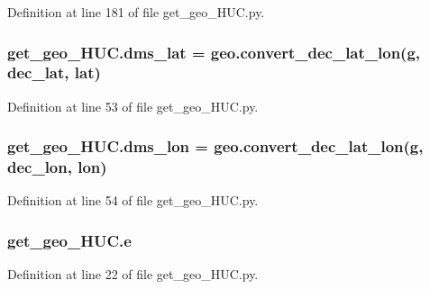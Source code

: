 Definition at line 181 of file get\+\_\+geo\+\_\+\+H\+U\+C.\+py.

\subsubsection[{\texorpdfstring{dms\+\_\+lat}{dms_lat}}]{\setlength{\rightskip}{0pt plus 5cm}get\+\_\+geo\+\_\+\+H\+U\+C.\+dms\+\_\+lat = geo.\+convert\+\_\+dec\+\_\+lat\+\_\+lon({\bf g}, {\bf dec\+\_\+lat}, \textquotesingle{}lat\textquotesingle{})}\hypertarget{namespaceget__geo___h_u_c_ac22be281ee4954369c420f4045ec3336}{}\label{namespaceget__geo___h_u_c_ac22be281ee4954369c420f4045ec3336}


Definition at line 53 of file get\+\_\+geo\+\_\+\+H\+U\+C.\+py.

\subsubsection[{\texorpdfstring{dms\+\_\+lon}{dms_lon}}]{\setlength{\rightskip}{0pt plus 5cm}get\+\_\+geo\+\_\+\+H\+U\+C.\+dms\+\_\+lon = geo.\+convert\+\_\+dec\+\_\+lat\+\_\+lon({\bf g}, {\bf dec\+\_\+lon}, \textquotesingle{}lon\textquotesingle{})}\hypertarget{namespaceget__geo___h_u_c_a3db416386a0a3ae6cf4b30fab0f65118}{}\label{namespaceget__geo___h_u_c_a3db416386a0a3ae6cf4b30fab0f65118}


Definition at line 54 of file get\+\_\+geo\+\_\+\+H\+U\+C.\+py.

\subsubsection[{\texorpdfstring{e}{e}}]{\setlength{\rightskip}{0pt plus 5cm}get\+\_\+geo\+\_\+\+H\+U\+C.\+e}\hypertarget{namespaceget__geo___h_u_c_aa7eddbf5988aec86b6750fa36bf532be}{}\label{namespaceget__geo___h_u_c_aa7eddbf5988aec86b6750fa36bf532be}


Definition at line 22 of file get\+\_\+geo\+\_\+\+H\+U\+C.\+py.

